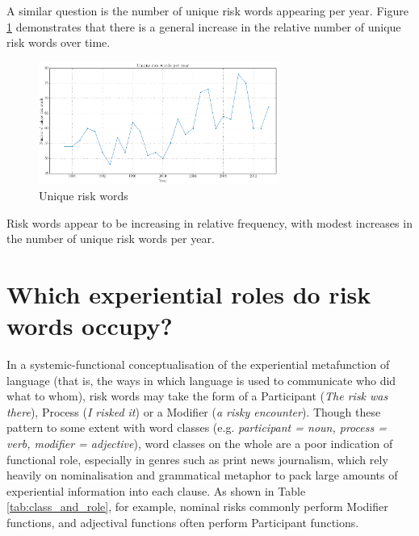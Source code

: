     A similar question is the number of unique risk words appearing per year. Figure \ref{fig:diffriskwords} demonstrates that there is a general increase in the relative number of unique risk words over time.

    \begin{figure}[htb!]
    \centering
    \includegraphics[width=0.7\textwidth]{../images/unique_no_legend}
    \caption{Unique risk words}
    \label{fig:diffriskwords}
    \end{figure}

    \vspace{5mm}\noindent\begin{tcolorbox}[colback=yellow!5,colframe=yellow!40!black,title=Summary: frequency of risk words]
    \parbox{1\textwidth}{%
    Risk words appear to be increasing in relative frequency, with modest increases in the number of unique risk words per year.}
    \end{tcolorbox}
    \vspace{5mm}

\section{Which experiential roles do risk words occupy?} \label{sect:exprole} \FloatBarrier

    In a systemic-functional conceptualisation of the experiential metafunction of language (that is, the ways in which language is used to communicate who did what to whom), risk words may take the form of a Participant (\emph{The risk was there}), Process (\emph{I risked it}) or a Modifier (\emph{a risky encounter}). Though these pattern to some extent with word classes (e.g. \emph{participant = noun, process = verb, modifier = adjective}), word classes on the whole are a poor indication of functional role, especially in genres such as print news journalism,  which rely heavily on nominalisation and grammatical metaphor to pack large amounts of experiential information into each clause. As shown in Table \ref{tab:class_and_role}, for example, nominal risks commonly perform Modifier functions, and adjectival functions often perform Participant functions.

